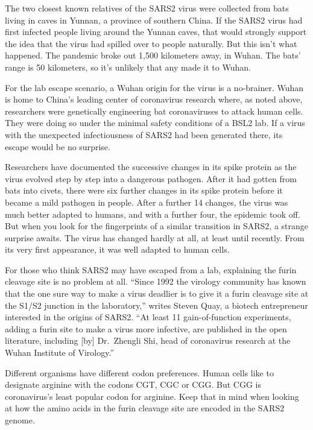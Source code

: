 \documentclass[
]{book}
\begin{document}
The two closest known relatives of the SARS2 virus were collected from bats living in caves in Yunnan, a province of southern China. If the SARS2 virus had first infected people living around the Yunnan caves, that would strongly support the idea that the virus had spilled over to people naturally. But this isn't what happened. The pandemic broke out 1,500 kilometers away, in Wuhan.
The bats' range is 50 kilometers, so it's unlikely that any made it to Wuhan.

For the lab escape scenario, a Wuhan origin for the virus is a no-brainer. Wuhan is home to China's leading center of coronavirus research where, as noted above, researchers were genetically engineering bat coronaviruses to attack human cells. They were doing so under the minimal safety conditions of a BSL2 lab. If a virus with the unexpected infectiousness of SARS2 had been generated there, its escape would be no surprise.

Researchers have documented the successive changes in its spike protein as the virus evolved step by step into a dangerous pathogen. After it had gotten from bats into civets, there were six further changes in its spike protein before it became a mild pathogen in people. After a further 14 changes, the virus was much better adapted to humans, and with a further four, the epidemic took off.
But when you look for the fingerprints of a similar transition in SARS2, a strange surprise awaits. The virus has changed hardly at all, at least until recently. From its very first appearance, it was well adapted to human cells.

For those who think SARS2 may have escaped from a lab, explaining the furin cleavage site is no problem at all. ``Since 1992 the virology community has known that the one sure way to make a virus deadlier is to give it a furin cleavage site at the S1/S2 junction in the laboratory,'' writes Steven Quay, a biotech entrepreneur interested in the origins of SARS2. ``At least 11 gain-of-function experiments, adding a furin site to make a virus more infective, are published in the open literature, including {[}by{]} Dr.~Zhengli Shi, head of coronavirus research at the Wuhan Institute of Virology.''

Different organisms have different codon preferences. Human cells like to designate arginine with the codons CGT, CGC or CGG. But CGG is coronavirus's least popular codon for arginine. Keep that in mind when looking at how the amino acids in the furin cleavage site are encoded in the SARS2 genome.
\end{document}
